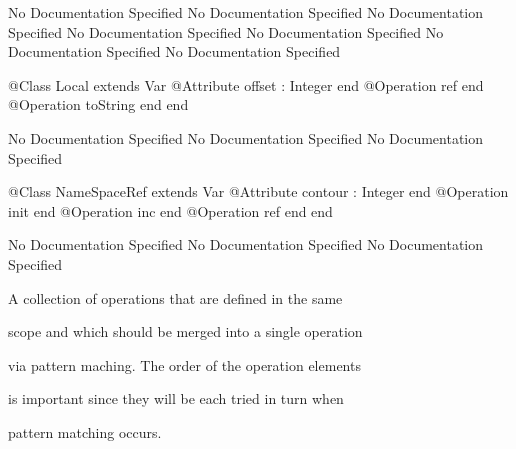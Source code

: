 No Documentation Specified
No Documentation Specified
No Documentation Specified
No Documentation Specified
No Documentation Specified
No Documentation Specified
No Documentation Specified
\begin{Interface}
@Class Local extends Var
  @Attribute offset : Integer end
  @Operation ref end
  @Operation toString end
end
\end{Interface}
No Documentation Specified
No Documentation Specified
No Documentation Specified
\begin{Interface}
@Class NameSpaceRef extends Var
  @Attribute contour : Integer end
  @Operation init end
  @Operation inc end
  @Operation ref end
end
\end{Interface}
No Documentation Specified
No Documentation Specified
No Documentation Specified

      A collection of operations that are defined in the same

      scope and which should be merged into a single operation

      via pattern maching. The order of the operation elements

      is important since they will be each tried in turn when

      pattern matching occurs.
      
